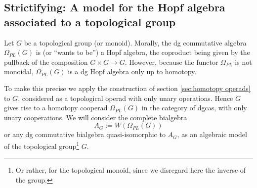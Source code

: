 \documentclass[a4paper]{amsart}
\theoremstyle{plain}
\theoremstyle{definition}
\begin{document}

\subsection{Strictifying: A model for the Hopf algebra associated to a topological group}
Let $G$ be a topological group (or monoid). Morally, the dg commutative algebra $\Omega_{PL}(G)$ is (or ``wants to be'') a Hopf algebra, the coproduct being given by the pullback of the composition $G\times G\to G$. However, because the functor $\Omega_{PL}$ is not monoidal, $\Omega_{PL}(G)$ is a dg Hopf algebra only up to homotopy.

To make this precise we apply the construction of section \ref{sec:homotopy operads} to $G$, considered as a topological operad with only unary operations.
Hence $G$ gives rise to a homotopy cooperad $\Omega_{PL}(G)$ in the category of dgcas, with only unary cooperations.
We will consider the complete bialgebra
\[
A_G := W(\Omega_{PL}(G))
\]
or any dg commutative bialgebra quasi-isomorphic to $A_G$,
as an algebraic model of the topological group\footnote{Or rather, for the topological monoid, since we disregard here the inverse of the group.} $G$.
\end{document}
